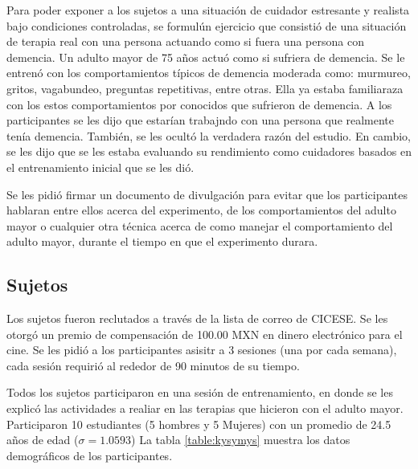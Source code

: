 Para poder exponer a los sujetos a una situaci\'on de cuidador estresante y realista bajo condiciones controladas, se formul\' un ejercicio que consisti\'o de una situaci\'on de terapia real con una persona actuando como si fuera una persona con demencia. Un adulto mayor de 75 a\~nos actu\'o como si sufriera de demencia. Se le entren\'o con los comportamientos t\'ipicos de demencia moderada como: murmureo, gritos, vagabundeo, preguntas repetitivas, entre otras. Ella ya estaba familiaraza con los estos comportamientos por conocidos que sufrieron de demencia. A los participantes se les dijo que estar\'ian trabajndo con una persona que realmente ten\'ia demencia. Tambi\'en, se les ocult\'o la verdadera raz\'on del estudio. En cambio, se les dijo que se les estaba evaluando su rendimiento como cuidadores basados en el entrenamiento inicial que se les di\'o.

Se les pidi\'o firmar un documento de divulgaci\'on para evitar que los participantes hablaran entre ellos acerca del experimento, de los comportamientos del adulto mayor o cualquier otra t\'ecnica acerca de como manejar el comportamiento del adulto mayor, durante el tiempo en que el experimento durara.

\subsection{Sujetos}
Los sujetos fueron reclutados a trav\'es de la lista de correo de CICESE. Se les otorg\'o un premio de compensaci\'on de 100.00 MXN en dinero electr\'onico para el cine. Se les pidi\'o a los participantes asisitr a 3 sesiones (una por cada semana), cada sesi\'on requiri\'o al rededor de 90 minutos de su tiempo.

Todos los sujetos participaron en una sesi\'on de entrenamiento, en donde se les explic\'o las actividades a realiar en las terapias que hicieron con el adulto mayor.
Participaron 10 estudiantes (5 hombres y 5 Mujeres) con un promedio de 24.5 a\~nos de edad ($\sigma=1.0593$) La tabla \ref{table:kysymys} muestra los datos demogr\'aficos de los participantes.

